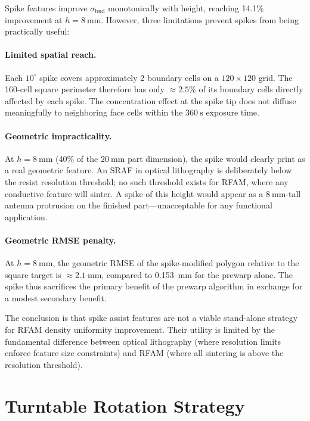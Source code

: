 \documentclass[10pt,twocolumn]{article}
\newcommand{\bndstd}{\sigma_{\mathrm{bnd}}}
\begin{document}
Spike features improve $\bndstd$ monotonically with height, reaching
14.1\% improvement at $h = \SI{8}{\milli\meter}$.  However, three
limitations prevent spikes from being practically useful:

\paragraph{Limited spatial reach.}
Each $10^\circ$ spike covers approximately 2 boundary cells on a
$120\times120$ grid.  The 160-cell square perimeter therefore has
only $\approx 2.5\%$ of its boundary cells directly affected by each
spike.  The concentration effect at the spike tip does not diffuse
meaningfully to neighboring face cells within the $\SI{360}{\second}$
exposure time.

\paragraph{Geometric impracticality.}
At $h = \SI{8}{\milli\meter}$ (40\% of the $\SI{20}{\milli\meter}$ part
dimension), the spike would clearly print as a real geometric feature.
An SRAF in optical lithography is deliberately below the resist
resolution threshold; no such threshold exists for RFAM, where any
conductive feature will sinter.  A spike of this height would appear
as a $\SI{8}{\milli\meter}$-tall antenna protrusion on the finished
part---unacceptable for any functional application.

\paragraph{Geometric RMSE penalty.}
At $h = \SI{8}{\milli\meter}$, the geometric RMSE of the spike-modified
polygon relative to the square target is $\approx \SI{2.1}{\milli\meter}$,
compared to \SI{0.153}{\milli\meter} for the prewarp alone.  The spike
thus sacrifices the primary benefit of the prewarp algorithm in exchange
for a modest secondary benefit.

The conclusion is that spike assist features are not a viable
stand-alone strategy for RFAM density uniformity improvement.  Their
utility is limited by the fundamental difference between optical
lithography (where resolution limits enforce feature size constraints)
and RFAM (where all sintering is above the resolution threshold).

\section{Turntable Rotation Strategy}
\label{sec:results_turntable}
\end{document}
